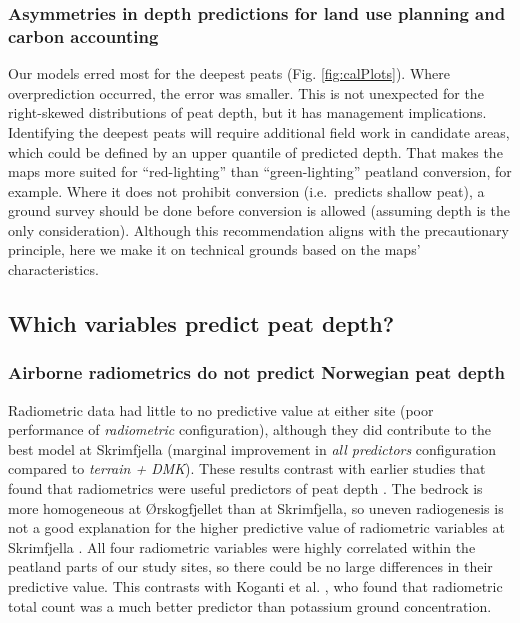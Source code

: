 \documentclass[soil, manuscript]{copernicus}
\begin{document}
\subsubsection{Asymmetries in depth predictions for land use planning and carbon accounting}

Our models erred most for the deepest peats (Fig. \ref{fig:calPlots}).
Where overprediction occurred, the error was smaller.
This is not unexpected for the right-skewed distributions of peat depth, but it has management implications.
Identifying the deepest peats will require additional field work in candidate areas, which could be defined by an upper quantile of predicted depth.
That makes the maps more suited for ``red-lighting'' than ``green-lighting'' peatland conversion, for example.
Where it does not prohibit conversion (i.e.~predicts shallow peat), a ground survey should be done before conversion is allowed (assuming depth is the only consideration).
Although this recommendation aligns with the precautionary principle, here we make it on technical grounds based on the maps' characteristics.

\subsection{Which variables predict peat depth?}

\subsubsection{Airborne radiometrics do not predict Norwegian peat depth}

Radiometric data had little to no predictive value at either site (poor performance of \emph{radiometric} configuration), although they did contribute to the best model at Skrimfjella (marginal improvement in \emph{all predictors} configuration compared to \emph{terrain + DMK}).
These results contrast with earlier studies that found that radiometrics were useful predictors of peat depth \citep{keaneySpatialStatisticsEstimate2013, gatisMappingUplandPeat2019, kogantiMappingPeatDepth2023}.
The bedrock is more homogeneous at Ørskogfjellet than at Skrimfjella, so uneven radiogenesis is not a good explanation for the higher predictive value of radiometric variables at Skrimfjella \citep{beamishEnvironmentalRadioactivityUK2014, reinhardtGammaraySpectrometryVersatile2019}.
All four radiometric variables were highly correlated within the peatland parts of our study sites, so there could be no large differences in their predictive value.
This contrasts with Koganti et al. \citeyearpar{kogantiMappingPeatDepth2023}, who found that radiometric total count was a much better predictor than potassium ground concentration.
\end{document}
